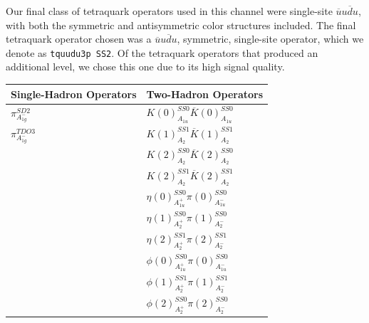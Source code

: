 Our final class of tetraquark operators used in this channel were single-site $\overline u u \overline d u$, with both the symmetric and antisymmetric color structures included. The final tetraquark operator chosen was a $\overline u u \overline d u$, symmetric, single-site operator, which we denote as \verb+tquudu3p SS2+. Of the tetraquark operators that produced an additional level, we chose this one due to its high signal quality.
\begin{table}
  \centering
  \begin{tabular}{l|l}
    \textbf{Single-Hadron Operators} & \textbf{Two-Hadron Operators}\\
    \hline
    $\pi_{A_{1g}^-}^{SD2}$ & $K(0)_{A_{1u}}^{SS0}\overline K(0)_{A_{1u}}^{SS0}$\\
$\pi_{A_{1g}^-}^{TDO3}$ & $K(1)_{A_2}^{SS1}\overline K(1)_{A_2}^{SS1}$\\
 & $K(2)_{A_2}^{SS0}\overline K(2)_{A_2}^{SS0}$\\
 & $K(2)_{A_2}^{SS1}\overline K(2)_{A_2}^{SS1}$\\
 & $\eta(0)_{A_{1u}^+}^{SS0}\pi(0)_{A_{1u}^-}^{SS0}$\\
 & $\eta(1)_{A_2^+}^{SS0}\pi(1)_{A_2^-}^{SS0}$\\
 & $\eta(2)_{A_2^+}^{SS1}\pi(2)_{A_2^-}^{SS1}$\\
 & $\phi(0)_{A_{1u}^+}^{SS0}\pi(0)_{A_{1u}^-}^{SS0}$\\
 & $\phi(1)_{A_2^+}^{SS1}\pi(1)_{A_2^-}^{SS1}$\\
 & $\phi(2)_{A_2^+}^{SS0}\pi(2)_{A_2^-}^{SS0}$


\end{tabular}
\end{table}
